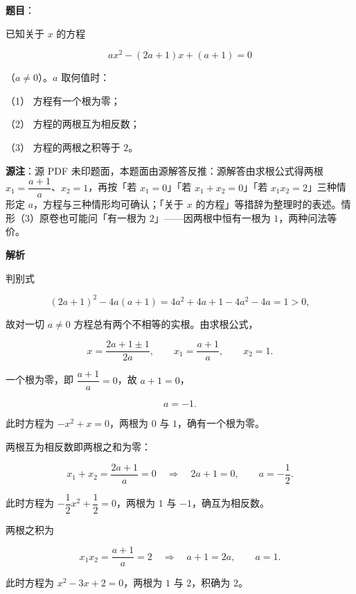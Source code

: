 \begin{answer}

\textbf{题目}：

已知关于 $x$ 的方程

\nopagebreak[4]
\[
ax^2-(2a+1)x+(a+1)=0
\]

（$a\ne0$）。$a$ 取何值时：

（1） 方程有一个根为零；

（2） 方程的两根互为相反数；

（3） 方程的两根之积等于 $2$。

\begin{gktip}
\textbf{源注}：源 PDF 未印题面，本题面由源解答反推：源解答由求根公式得两根 $x_1=\dfrac{a+1}{a}$、$x_2=1$，再按「若 $x_1=0$」「若 $x_1+x_2=0$」「若 $x_1x_2=2$」三种情形定 $a$，方程与三种情形均可确认；「关于 $x$ 的方程」等措辞为整理时的表述。情形（3）原卷也可能问「有一根为 $2$」——因两根中恒有一根为 $1$，两种问法等价。
\end{gktip}

\textbf{解析}

判别式

\nopagebreak[4]
\[
(2a+1)^2-4a(a+1)=4a^2+4a+1-4a^2-4a=1>0,
\]

故对一切 $a\ne0$ 方程总有两个不相等的实根。由求根公式，

\nopagebreak[4]
\[
x=\frac{2a+1\pm1}{2a},
\qquad
x_1=\frac{a+1}{a},
\qquad
x_2=1.
\]


一个根为零，即 $\dfrac{a+1}{a}=0$，故 $a+1=0$，

\nopagebreak[4]
\[
a=-1.
\]

此时方程为 $-x^2+x=0$，两根为 $0$ 与 $1$，确有一个根为零。


两根互为相反数即两根之和为零：

\nopagebreak[4]
\[
x_1+x_2=\frac{2a+1}{a}=0
\quad\Longrightarrow\quad
2a+1=0,
\qquad
a=-\frac12.
\]

此时方程为 $-\dfrac12x^2+\dfrac12=0$，两根为 $1$ 与 $-1$，确互为相反数。


两根之积为

\nopagebreak[4]
\[
x_1x_2=\frac{a+1}{a}=2
\quad\Longrightarrow\quad
a+1=2a,
\qquad
a=1.
\]

此时方程为 $x^2-3x+2=0$，两根为 $1$ 与 $2$，积确为 $2$。




\end{answer}
